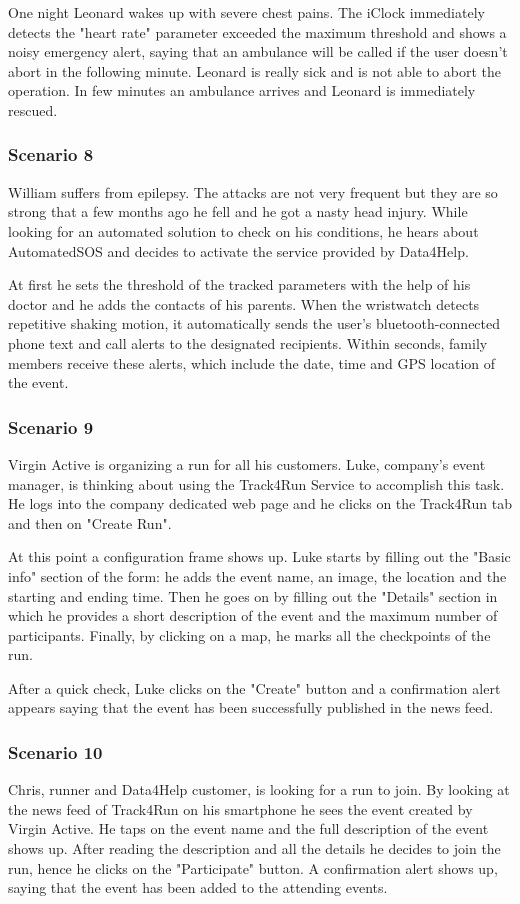 One night Leonard wakes up with severe chest pains. The iClock immediately detects the "heart rate" parameter exceeded the maximum threshold and shows a noisy emergency alert, saying that an ambulance will be called if the user doesn't abort in the following minute. Leonard is really sick and is not able to abort the operation. In few minutes an ambulance arrives and Leonard is immediately rescued.
\subsubsection{Scenario 8}
William suffers from epilepsy. The attacks are not very frequent but they are so strong that a few months ago he fell and he got a nasty head injury. While looking for an automated solution to check on his conditions, he hears about AutomatedSOS and decides to activate the service provided by Data4Help.

At first he sets the threshold of the tracked parameters with the help of his doctor and he adds the contacts of his parents. When the wristwatch detects repetitive shaking motion, it automatically sends the user’s bluetooth-connected phone text and call alerts to the designated recipients. Within seconds, family members receive these alerts, which include the date, time and GPS location of the event.
\subsubsection{Scenario 9}
Virgin Active is organizing a run for all his customers. Luke, company's event manager, is thinking about using the Track4Run Service to accomplish this task. He logs into the company dedicated web page and he clicks on the Track4Run tab and then on "Create Run".

At this point a configuration frame shows up. Luke starts by filling out the "Basic info" section of the form: he adds the event name, an image, the location and the starting and ending time. Then he goes on by filling out the "Details" section in which he provides a short description of the event and the maximum number of participants. Finally, by clicking on a map, he marks all the checkpoints of the run.

After a quick check, Luke clicks on the "Create" button and a confirmation alert appears saying that the event has been successfully published in the news feed.
\subsubsection{Scenario 10}
Chris, runner and Data4Help customer, is looking for a run to join. By looking at the  news feed of Track4Run on his smartphone he sees the event created by Virgin Active. He taps on the event name and the full description of the event shows up. After reading the description and all the details he decides to join the run, hence he clicks on the "Participate" button. A confirmation alert shows up, saying that the event has been added to the attending events.
